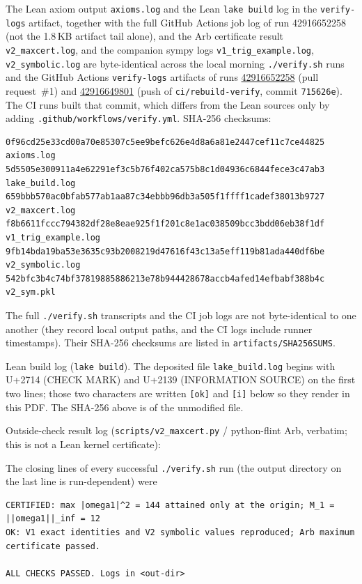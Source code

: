 \documentclass[11pt]{article}
\theoremstyle{remark}
\begin{document}
The Lean axiom output \texttt{axioms.log} and the Lean \texttt{lake build} log in the \texttt{verify-logs} artifact, together with the full GitHub Actions job log of run 42916652258 (not the 1.8\,KB artifact tail alone), and the Arb
certificate result \texttt{v2\_maxcert.log}, and the companion sympy logs
\texttt{v1\_trig\_example.log}, \texttt{v2\_symbolic.log} are byte-identical across the local morning
\texttt{./verify.sh} runs and the GitHub Actions \texttt{verify-logs} artifacts of runs
\href{https://github.com/BenFrohman/ns-tether-key-estimate-refutation/actions/runs/42916652258}{42916652258}
(pull request~\#1) and
\href{https://github.com/BenFrohman/ns-tether-key-estimate-refutation/actions/runs/42916649801}{42916649801}
(push of \texttt{ci/rebuild-verify}, commit \texttt{715626e}). The CI runs built that commit, which
differs from the Lean sources only by adding \texttt{.github/workflows/verify.yml}.
SHA-256 checksums:
{\fontsize{6}{7.2}\selectfont
\begin{verbatim}
0f96cd25e33cd00a70e85307c5ee9befc626e4d8a6a81e2447cef11c7ce44825  axioms.log
5d5505e300911a4e62291ef3c5b76f402ca575b8c1d04936c6844fece3c47ab3  lake_build.log
659bbb570ac0bfab577ab1aa87c34ebbb96db3a505f1ffff1cadef38013b9727  v2_maxcert.log
f8b6611fccc794382df28e8eae925f1f201c8e1ac038509bcc3bdd06eb38f1df  v1_trig_example.log
9fb14bda19ba53e3635c93b2008219d47616f43c13a5eff119b81ada440df6be  v2_symbolic.log
542bfc3b4c74bf37819885886213e78b944428678accb4afed14efbabf388b4c  v2_sym.pkl
\end{verbatim}
}
The full \texttt{./verify.sh} transcripts and the CI job logs are not byte-identical to one another
(they record local output paths, and the CI logs include runner timestamps). Their SHA-256
checksums are listed in \texttt{artifacts/SHA256SUMS}.

Lean build log (\texttt{lake build}). The deposited file \texttt{lake\_build.log} begins with
U+2714 (CHECK MARK) and U+2139 (INFORMATION SOURCE) on the first two lines; those two
characters are written \texttt{[ok]} and \texttt{[i]} below so they render in this PDF. The
SHA-256 above is of the unmodified file.
{\fontsize{6.5}{7.5}\selectfont
{}
}

Outside-check result log (\texttt{scripts/v2\_maxcert.py} / python-flint Arb, verbatim; this is not a Lean kernel certificate):
{\fontsize{6.5}{7.5}\selectfont
{}
}

The closing lines of every successful \texttt{./verify.sh} run (the output directory on the last
line is run-dependent) were
{\fontsize{6.5}{7.5}\selectfont
\begin{verbatim}
CERTIFIED: max |omega1|^2 = 144 attained only at the origin; M_1 = ||omega1||_inf = 12
OK: V1 exact identities and V2 symbolic values reproduced; Arb maximum certificate passed.

ALL CHECKS PASSED. Logs in <out-dir>
\end{verbatim}
}
\end{document}
